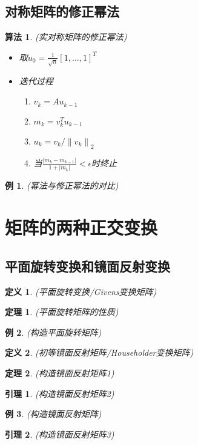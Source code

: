 \documentclass[twoside]{article}
\newtheorem{theorem}{定理}[section]
\newtheorem{algo}{算法}[section]
\newtheorem{lemma}{引理}[section]
\newtheorem{definition}{定义}[section]
\newtheorem{eg}{例}[section]
\begin{document}
\subsection{对称矩阵的修正幂法}
\begin{algo}
  (实对称矩阵的修正幂法)
  \begin{itemize}
    \item 取$u_0 = \frac{1}{\sqrt{n}} {[1,\ldots,1]}^T$
    \item 迭代过程
      \begin{enumerate}
        \item $v_k = A u_{k-1}$
        \item $m_k=v_k^T u_{k-1}$
        \item $u_k=v_k/{ \|v_k\| }_2$
        \item 当$\frac{|m_k-m_{k-1}|}{1+|m_k|}<\epsilon$时终止
      \end{enumerate}
  \end{itemize}
\end{algo}
\begin{eg}
  (幂法与修正幂法的对比)
\end{eg}

\section{矩阵的两种正交变换}
\subsection{平面旋转变换和镜面反射变换}
\begin{definition}
  (平面旋转变换/Givens变换矩阵)
\end{definition}
\begin{theorem}
  (平面旋转矩阵的性质)
\end{theorem}
\begin{eg}
  (构造平面旋转矩阵)
\end{eg}
\begin{definition}
  (初等镜面反射矩阵/Householder变换矩阵)
\end{definition}
\begin{theorem}
  (构造镜面反射矩阵1)
\end{theorem}
\begin{lemma}
  (构造镜面反射矩阵2)
\end{lemma}
\begin{eg}
  (构造镜面反射矩阵)
\end{eg}
\begin{lemma}
  (构造镜面反射矩阵3)
\end{lemma}
\end{document}
